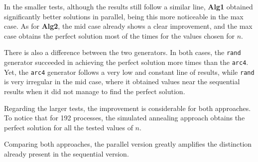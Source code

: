 In the smaller tests, although the results still follow a similar line, \textbf{Alg1} obtained significantly better solutions in parallel, being this more noticeable in the max case. As for \textbf{Alg2}, the mid case already shows a clear improvement, and the max case obtains the perfect solution most of the times for the values chosen for $n$.

There is also a difference between the two generators. In both cases, the \texttt{rand} generator succeeded in achieving the perfect solution more times than the \texttt{arc4}. Yet, the \texttt{arc4} generator follows a very low and constant line of results, while \texttt{rand} is very irregular in the mid case, where it obtained values near the sequential results when it did not manage to find the perfect solution.

Regarding the larger tests, the improvement is considerable for both approaches. To notice that for 192 processes, the simulated annealing approach obtains the perfect solution for all the tested values of $n$.

Comparing both approaches, the parallel version greatly amplifies the distinction already present in the sequential version.

